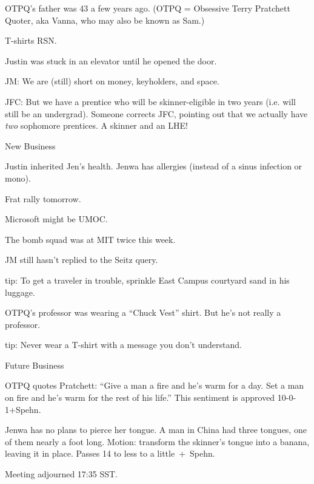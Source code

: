 \documentclass[12pt]{article}
\begin{document}
OTPQ's father was 43 a few years ago.  (OTPQ = Obsessive Terry Pratchett
Quoter, aka Vanna, who may also be known as Sam.)

T-shirts RSN.

Justin was stuck in an elevator until he opened the door.

JM: We are (still) short on money, keyholders, and space.

JFC: But we have a prentice who will be skinner-eligible in two years
(i.e. will still be an undergrad).  Someone corrects JFC, pointing out
that we actually have {\it two} sophomore prentices.  A skinner and an
LHE!

\vskip 12pt

\centerline{New Business}

Justin inherited Jen's health.
Jenwa has allergies (instead of a sinus infection or mono).

Frat rally tomorrow.

Microsoft might be UMOC.

The bomb squad was at MIT twice this week.

JM still hasn't replied to the Seitz query.

tip: To get a traveler in trouble, sprinkle East Campus courtyard
sand in his luggage.

OTPQ's professor was wearing a ``Chuck Vest'' shirt.  But he's not
really a professor.

tip: Never wear a T-shirt with a message you don't understand.

\vskip 12pt

\centerline{Future Business}

OTPQ quotes Pratchett: ``Give a man a fire and he's warm for a day.
Set a man on fire and he's warm for the rest of his life.''  This
sentiment is approved 10-0-1+Spehn.

Jenwa has no plans to pierce her tongue.
A man in China had three tongues, one of them nearly a foot long.
Motion: transform the skinner's tongue into a banana, leaving it in
place.  Passes 14 to less to a little~+~Spehn.

Meeting adjourned 17:35 SST.
\end{document}

